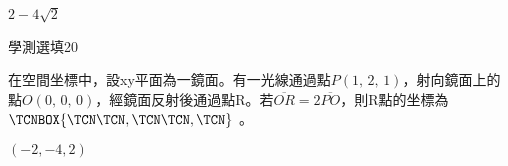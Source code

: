 \begin{QUESTIONS}
\begin{QUESTION}
\begin{QBODY}
        \end{QBODY}
        \begin{QFROMS}
        \end{QFROMS}
        \begin{QTAGS}\end{QTAGS}
        \begin{QANS}
                        $2-4\sqrt{2}$
        \end{QANS}
        \begin{QSOLLIST}
        \end{QSOLLIST}
        \begin{QEMPTYSPACE}
        \end{QEMPTYSPACE}
    \end{QUESTION}
    \begin{QUESTION}
        \begin{ExamInfo}{84}{學測}{選填}{20}
        \end{ExamInfo}
        \begin{ExamAnsRateInfo}{}{}{}{}
        \end{ExamAnsRateInfo}
        \begin{QBODY}
            在空間坐標中，設xy平面為一鏡面。有一光線通過點$P\left( 1,\,2,\,1 \right)$，射向鏡面上的點$O\left( 0,\,0,\,0 \right)$，經鏡面反射後通過點R。若$\overline{OR}=2\overline{PO}$，則R點的坐標為$\TCNBOX{\TCN\TCN,\TCN\TCN,\TCN}$ 。
        \end{QBODY}
        \begin{QFROMS}
        \end{QFROMS}
        \begin{QTAGS}\end{QTAGS}
        \begin{QANS}
            $(-2,-4,2)$
        \end{QANS}
        \begin{QSOLLIST}
        \end{QSOLLIST}
        \begin{QEMPTYSPACE}
        \end{QEMPTYSPACE}
    \end{QUESTION}
\end{QUESTIONS}